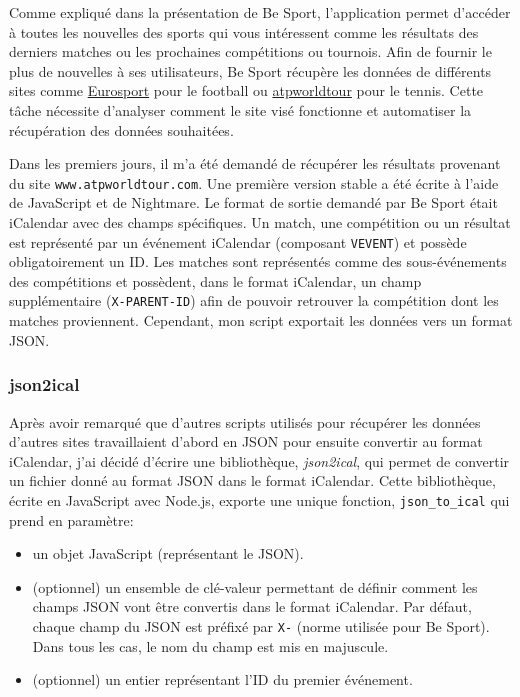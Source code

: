 Comme expliqué dans la présentation de Be Sport, l'application permet d'accéder
à toutes les nouvelles des sports qui vous intéressent comme les résultats des
derniers matches ou les prochaines compétitions ou tournois.
Afin de fournir le plus de nouvelles à ses utilisateurs, Be Sport récupère les
données de différents sites comme \href{https://eurosport.fr}{Eurosport} pour le
football ou \href{https://atpworldtour.com}{atpworldtour} pour le tennis.
Cette tâche nécessite d'analyser comment le site visé fonctionne et automatiser
la récupération des données souhaitées.

Dans les premiers jours, il m'a été demandé de récupérer les résultats provenant
du site \verb|www.atpworldtour.com|.
Une première version stable a été écrite à l'aide de JavaScript et de
Nightmare\cite{nightmare-website}. Le format de sortie demandé par Be Sport était
iCalendar avec des champs spécifiques.
Un match, une compétition ou un résultat est représenté par un événement
iCalendar (composant \verb|VEVENT|) et possède obligatoirement un ID. Les
matches sont représentés comme des sous-événements des compétitions et
possèdent, dans le format iCalendar, un champ supplémentaire
(\verb|X-PARENT-ID|) afin de pouvoir retrouver la compétition dont les matches
proviennent.
Cependant, mon script exportait les données vers un
format JSON. 

\subsubsection*{json2ical}

Après avoir remarqué que d'autres scripts utilisés pour récupérer les données
d'autres sites travaillaient d'abord en JSON pour ensuite convertir au format
iCalendar, j'ai décidé d'écrire une bibliothèque, \emph{json2ical}, qui permet
de convertir un fichier donné au format JSON dans le format iCalendar.
Cette bibliothèque, écrite en JavaScript avec Node.js, exporte une unique
fonction, \verb|json_to_ical| qui prend en paramètre:

\begin{itemize}
  \item un objet JavaScript (représentant le JSON).
  \item (optionnel) un ensemble de clé-valeur permettant de définir comment les champs JSON
    vont être convertis dans le format iCalendar. Par défaut, chaque champ du
    JSON est préfixé par \verb|X-| (norme utilisée pour Be Sport). Dans tous les
    cas, le nom du champ est mis en majuscule.
  \item (optionnel) un entier représentant l'ID du premier événement.
\end{itemize}

